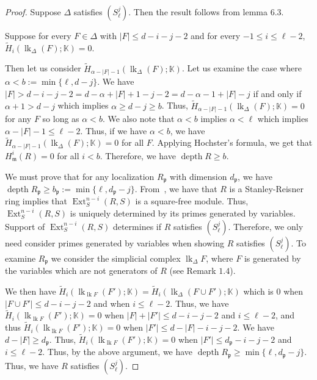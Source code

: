 \documentclass[11pt]{amsart}
\numberwithin{equation}{section}
\theoremstyle{definition}
\theoremstyle{remark}
\newcommand{\lk}{\operatorname{lk}}
\newcommand{\Ext}{\operatorname{Ext}}
\newcommand{\depth}{\operatorname{depth}}
\begin{document}
\begin{proof}
Suppose $\Delta$ satisfies $(S_\ell^j)$.  Then the result follows from lemma $6.3$.

Suppose for every $F \in \Delta$ with $|F| \leq d-i-j-2$ and for every $-1\leq i \leq \ell-2$, $\tilde{H}_i(\lk_{\Delta}(F);\mathbb{K}) = 0$.  

Then let us consider $\tilde{H}_{\alpha - |F| -1}(\lk_{\Delta}(F);\mathbb{K})$.  Let us examine the case where $\alpha < b:=\min \{\ell, d-j\}$.  We have $|F| > d-i-j-2=d-\alpha+|F|+1-j-2=d-\alpha-1+|F|-j$ if and only if $\alpha+1>d-j$ which implies $\alpha \geq d-j \geq b$.  Thus, $\tilde{H}_{\alpha - |F| - 1}(\lk_{\Delta}(F);\mathbb{K}) = 0$ for any $F$ so long as $\alpha < b$.  We also note that $\alpha < b$ implies $\alpha <\ell$ which implies $\alpha -|F|-1 \leq \ell-2$.  Thus, if we have $\alpha < b$, we have $\tilde{H}_{\alpha - |F| -1}(\lk_{\Delta}(F);\mathbb{K}) = 0$ for all $F$.  Applying Hochster's formula, we get that $H_\mathfrak{m}^i(R)=0$ for all $i < b$.  Therefore, we have $\depth R \geq b$.

We must prove that for any localization $R_\mathfrak{p}$ with dimension $d_\mathfrak{p}$, we have $\depth R_\mathfrak{p} \geq b_\mathfrak{p}:= \min \{ \ell,d_\mathfrak{p}-j \}$.  From~\cite{Ya00}, we have that $R$ is a Stanley-Reisner ring implies that $\Ext _S^{n-i}(R,S)$ is a square-free module.  Thus, $\Ext _S^{n-i}(R,S)$ is uniquely determined by its primes generated by variables.  Support of $\Ext _S^{n-i}(R,S)$ determines if $R$ satisfies $(S_\ell^j)$.  Therefore, we only need consider primes generated by variables when showing $R$ satisfies $(S_\ell^j)$.  To examine $R_\mathfrak{p}$ we consider the simplicial complex $\lk_\Delta F$, where $F$ is generated by the variables which are not generators of $R$ (see Remark $1.4$).  

We then have $\tilde{H}_{i}(\lk_{\lk F}(F');\mathbb{K}) = \tilde{H}_{i}(\lk_{\Delta}(F \cup F');\mathbb{K})$ which is $0$ when $|F \cup F'| \leq d-i-j-2$ and when $i \leq \ell-2$.  Thus, we have $\tilde{H}_{i}(\lk_{\lk F}(F');\mathbb{K}) = 0$ when $|F|+|F'| \leq d-i-j-2$ and $i \leq \ell-2$, and thus $\tilde{H}_{i}(\lk_{\lk F}(F');\mathbb{K}) =0$ when $|F'| \leq d-|F|-i-j-2$.  We have $d-|F|\geq d_\mathfrak{p}$.  Thus, $\tilde{H}_{i}(\lk_{\lk F}(F');\mathbb{K}) =0$ when $|F'| \leq d_\mathfrak{p}-i-j-2$ and $i \leq \ell-2$.  Thus, by the above argument, we have $\depth R_\mathfrak{p} \geq \min \{ \ell, d_\mathfrak{p}-j \}$.  Thus, we have $R$ satisfies $(S_\ell^j)$.  
\end{proof}
\end{document}
